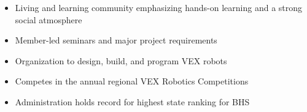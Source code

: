 \documentclass[10pt,a4paper,ragged2e,withhyper]{altacv}
\begin{document}
\begin{paracol}{2}
\medskip 


\begin{itemize}
    \item Living and learning community emphasizing hands-on learning and a strong social atmosphere
    \item Member-led seminars and major project requirements
\end{itemize}

\divider

\begin{itemize}
    \item Organization to design, build, and program VEX robots
    \item Competes in the annual regional VEX Robotics Competitions
    \item Administration holds record for highest state ranking for BHS
\end{itemize}

\medskip

\end{paracol}
\end{document}
